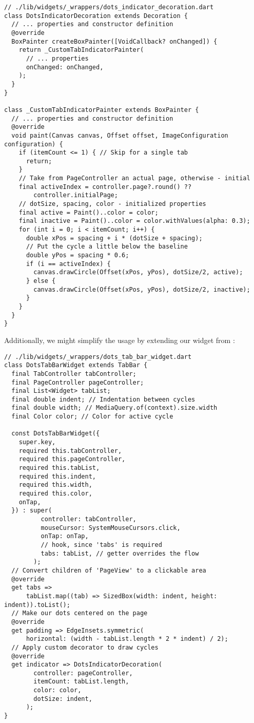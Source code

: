 \begin{lstlisting}
// ./lib/widgets/_wrappers/dots_indicator_decoration.dart
class DotsIndicatorDecoration extends Decoration {
  // ... properties and constructor definition
  @override
  BoxPainter createBoxPainter([VoidCallback? onChanged]) {
    return _CustomTabIndicatorPainter(
      // ... properties
      onChanged: onChanged,
    );
  }
}

class _CustomTabIndicatorPainter extends BoxPainter {
  // ... properties and constructor definition
  @override
  void paint(Canvas canvas, Offset offset, ImageConfiguration configuration) {
    if (itemCount <= 1) { // Skip for a single tab
      return;
    }
    // Take from PageController an actual page, otherwise - initial
    final activeIndex = controller.page?.round() ?? 
        controller.initialPage;
    // dotSize, spacing, color - initialized properties
    final active = Paint()..color = color;
    final inactive = Paint()..color = color.withValues(alpha: 0.3);
    for (int i = 0; i < itemCount; i++) {
      double xPos = spacing + i * (dotSize + spacing);
      // Put the cycle a little below the baseline
      double yPos = spacing * 0.6; 
      if (i == activeIndex) {
        canvas.drawCircle(Offset(xPos, yPos), dotSize/2, active);
      } else {
        canvas.drawCircle(Offset(xPos, yPos), dotSize/2, inactive);
      }
    }
  }
}
\end{lstlisting}

\noindent Additionally, we might simplify the usage by extending our widget from :

\begin{lstlisting}
// ./lib/widgets/_wrappers/dots_tab_bar_widget.dart
class DotsTabBarWidget extends TabBar {
  final TabController tabController;
  final PageController pageController;
  final List<Widget> tabList;
  final double indent; // Indentation between cycles
  final double width; // MediaQuery.of(context).size.width
  final Color color; // Color for active cycle

  const DotsTabBarWidget({
    super.key,
    required this.tabController,
    required this.pageController,
    required this.tabList,
    required this.indent,
    required this.width,
    required this.color,
    onTap,
  }) : super(
          controller: tabController,
          mouseCursor: SystemMouseCursors.click,
          onTap: onTap,
          // hook, since 'tabs' is required
          tabs: tabList, // getter overrides the flow
        );
  // Convert children of 'PageView' to a clickable area 
  @override
  get tabs =>
      tabList.map((tab) => SizedBox(width: indent, height: indent)).toList();
  // Make our dots centered on the page
  @override
  get padding => EdgeInsets.symmetric(
      horizontal: (width - tabList.length * 2 * indent) / 2);
  // Apply custom decorator to draw cycles
  @override
  get indicator => DotsIndicatorDecoration(
        controller: pageController,
        itemCount: tabList.length,
        color: color,
        dotSize: indent,
      );
}
\end{lstlisting}
